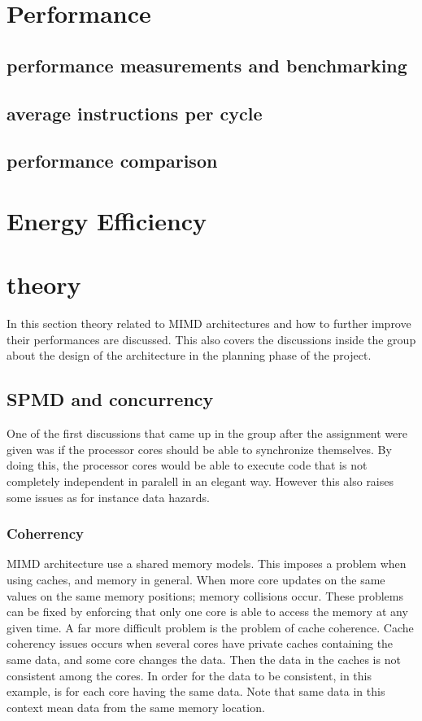 \section{Performance}
\subsection{performance measurements and benchmarking}
\subsection{average instructions per cycle}
\subsection{performance comparison}


\section{Energy Efficiency}

\section{theory}
In this section theory related to MIMD architectures and how to further improve their performances are discussed.
This also covers the discussions inside the group about the design of the architecture in the planning phase of the project.
\subsection{SPMD and concurrency}
One of the first discussions that came up in the group after the assignment were given was if the processor cores should
be able to synchronize themselves. By doing this, the processor cores would be able to execute code that is not completely independent in paralell in an elegant way.
However this also raises some issues as for instance data hazards.

\subsubsection{Coherrency}
MIMD architecture use a shared memory models. This imposes a problem when using caches, and memory in general. When more core updates on the same values on the same memory positions; memory collisions occur. These problems can be fixed by enforcing that only one core is able to access the memory at any given time. A far more difficult problem is the problem of cache coherence. Cache coherency issues occurs when several cores have private caches containing the same data, and some core changes the data. Then the data in the caches is not consistent among the cores. In order for the data to be consistent, in this example, is for each core having the same data. Note that same data in this context mean data from the same memory location. 

